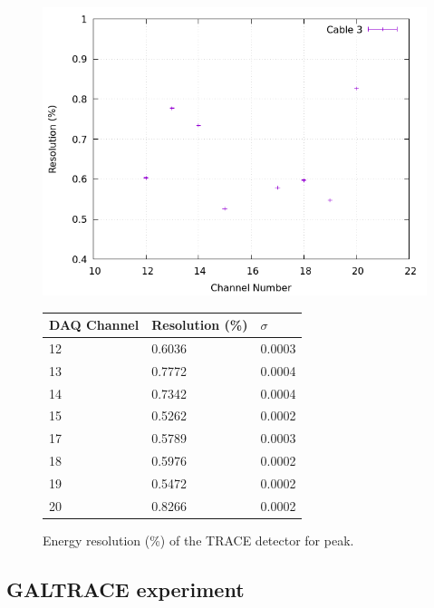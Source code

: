 \begin{figure}[h]
  \centering
  \begin{minipage}[b]{0.45\textwidth}
  \vspace{5mm}
    \includegraphics[width=\textwidth]{img/plot/cm/3_res_cm.png}
    \label{res:cm3}
  \end{minipage}
  \hfill
  \begin{minipage}[b]{0.45\textwidth}
  \begin{tabular}{lll}
    DAQ Channel & Resolution (\%) & $\sigma$ \\
    \midrule
    12 & \num{0.6036} & 0.0003 \\
    13 & \num{0.7772} & 0.0004 \\
    14 & \num{0.7342} & 0.0004 \\
    15 & \num{0.5262} & 0.0002 \\
    17 & \num{0.5789} & 0.0003 \\
    18 & \num{0.5976} & 0.0002 \\
    19 & \num{0.5472} & 0.0002 \\
    20 & \num{0.8266} & 0.0002 \\
    \bottomrule
  \end{tabular}
  \label{res:plot:cm3}
  \end{minipage}
  \caption{Energy resolution (\%) of the TRACE detector for  peak.}
  \label{res:cm}
\end{figure}


\clearpage

\subsection{GALTRACE experiment}

